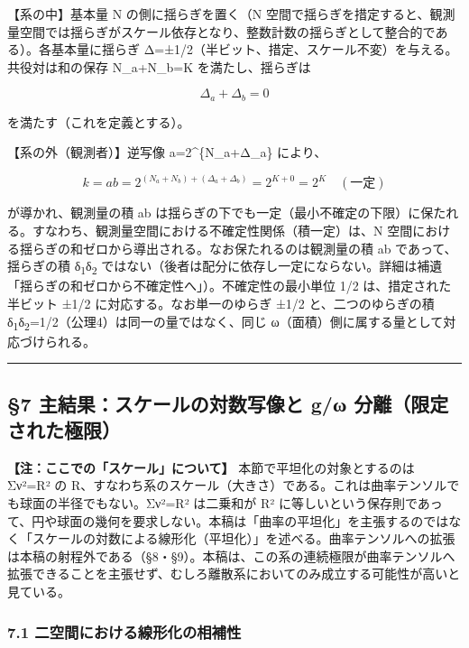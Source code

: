 \documentclass[11pt]{ltjsarticle}
\begin{document}
【系の中】基本量 N の側に揺らぎを置く（N
空間で揺らぎを措定すると、観測量空間では揺らぎがスケール依存となり、整数計数の揺らぎとして整合的である）。各基本量に揺らぎ
Δ=±1/2（半ビット、措定、スケール不変）を与える。共役対は和の保存
N\_a+N\_b=K を満たし、揺らぎは

\[\boxed{\ \Delta_a + \Delta_b = 0\ }\]

を満たす（これを定義とする）。

【系の外（観測者）】逆写像 a=2\^{}\{N\_a+Δ\_a\} により、

\[k = ab = 2^{(N_a+N_b)+(\Delta_a+\Delta_b)} = 2^{K+0} = 2^K \quad(\text{一定})\]

が導かれ、観測量の積 ab
は揺らぎの下でも一定（最小不確定の下限）に保たれる。すなわち、観測量空間における不確定性関係（積一定）は、N
空間における揺らぎの和ゼロから導出される。なお保たれるのは観測量の積 ab
であって、揺らぎの積 δ\textsubscript{1}δ\textsubscript{2}
ではない（後者は配分に依存し一定にならない。詳細は補遺「揺らぎの和ゼロから不確定性へ」）。不確定性の最小単位
1/2 は、措定された半ビット ±1/2 に対応する。なお単一のゆらぎ ±1/2
と、二つのゆらぎの積 δ\textsubscript{1}δ\textsubscript{2}=1/2（公理4）は同一の量ではなく、同じ
ω（面積）側に属する量として対応づけられる。

\begin{center}\rule{0.5\linewidth}{0.5pt}\end{center}

\subsection{§7 主結果：スケールの対数写像と g/ω
分離（限定された極限）}\label{ux4e3bux7d50ux679cux30b9ux30b1ux30fcux30ebux306eux5bfeux6570ux5199ux50cfux3068-gux3c9-ux5206ux96e2ux9650ux5b9aux3055ux308cux305fux6975ux9650}

\textbf{【注：ここでの「スケール」について】}
本節で平坦化の対象とするのは Σν²=R² の
R、すなわち系のスケール（大きさ）である。これは曲率テンソルでも球面の半径でもない。Σν²=R²
は二乗和が R²
に等しいという保存則であって、円や球面の幾何を要求しない。本稿は「曲率の平坦化」を主張するのではなく「スケールの対数による線形化（平坦化）」を述べる。曲率テンソルへの拡張は本稿の射程外である（§8・§9）。本稿は、この系の連続極限が曲率テンソルへ拡張できることを主張せず、むしろ離散系においてのみ成立する可能性が高いと見ている。

\subsubsection{7.1
二空間における線形化の相補性}\label{ux4e8cux7a7aux9593ux306bux304aux3051ux308bux7ddaux5f62ux5316ux306eux76f8ux88dcux6027}
\end{document}
